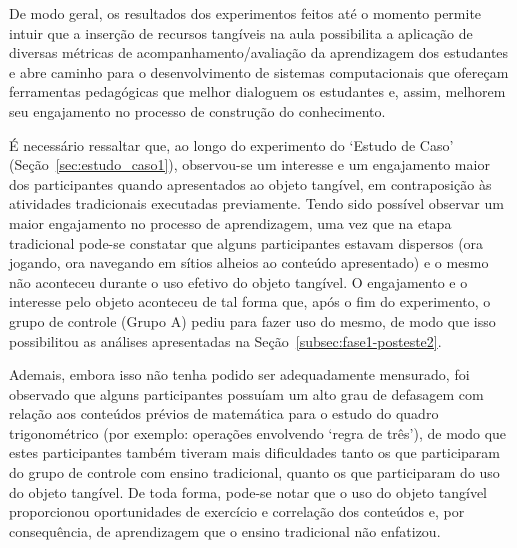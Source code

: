 
De modo geral, os resultados dos experimentos feitos até o momento permite intuir que a inserção de recursos tangíveis na aula possibilita a aplicação de diversas métricas de acompanhamento/avaliação da aprendizagem dos estudantes e abre caminho para o desenvolvimento de sistemas computacionais %
que ofereçam %
ferramentas pedagógicas que melhor dialoguem os estudantes e, assim, melhorem seu engajamento no processo de construção do conhecimento.

É necessário ressaltar que, ao longo do experimento do `Estudo de Caso' (Seção~\ref{sec:estudo_caso1}), observou-se um interesse e um engajamento maior dos participantes quando apresentados ao objeto tangível, em contraposição às atividades tradicionais executadas previamente. Tendo sido possível observar um maior engajamento no processo de aprendizagem, uma vez que na etapa tradicional pode-se constatar que alguns participantes estavam dispersos (ora jogando, ora navegando em sítios alheios ao conteúdo apresentado) e o mesmo não aconteceu durante o uso efetivo do objeto tangível. O engajamento e o interesse pelo objeto aconteceu de tal forma que, após o fim do experimento, o grupo de controle (Grupo A) pediu para fazer uso do mesmo, de modo que isso possibilitou as análises apresentadas na Seção~\ref{subsec:fase1-posteste2}.

Ademais, embora isso não tenha podido ser adequadamente mensurado, foi observado que alguns participantes possuíam um alto grau de defasagem com relação aos conteúdos prévios de matemática para o estudo do quadro trigonométrico (por exemplo: operações envolvendo `regra de três'), de modo que estes participantes também tiveram mais dificuldades tanto os que participaram do grupo de controle com ensino tradicional, quanto os que participaram do uso do objeto tangível. De toda forma, pode-se notar que o uso do objeto tangível proporcionou oportunidades de exercício e correlação dos conteúdos e, por consequência, de aprendizagem que o ensino tradicional não enfatizou.

